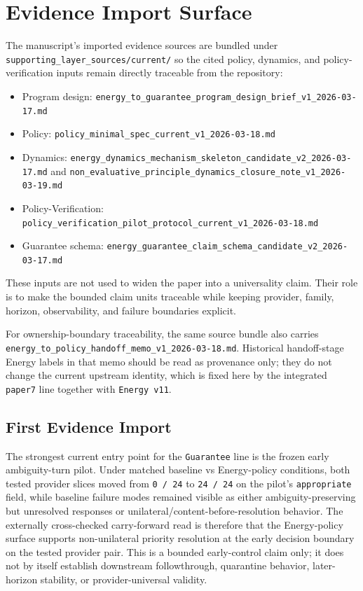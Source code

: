 \documentclass[11pt]{article}
\begin{document}
\section{Evidence Import Surface}

The manuscript's imported evidence sources are bundled under
\texttt{supporting\_layer\_sources/current/} so the cited policy, dynamics,
and policy-verification inputs remain directly traceable from the repository:

\begin{itemize}
\item Program design:
  \texttt{energy\_to\_guarantee\_program\_design\_brief\_v1\_2026-03-17.md}
\item Policy:
  \texttt{policy\_minimal\_spec\_current\_v1\_2026-03-18.md}
\item Dynamics:
  \texttt{energy\_dynamics\_mechanism\_skeleton\_candidate\_v2\_2026-03-17.md}
  and
  \texttt{non\_evaluative\_principle\_dynamics\_closure\_note\_v1\_2026-03-19.md}
\item Policy-Verification:
  \texttt{policy\_verification\_pilot\_protocol\_current\_v1\_2026-03-18.md}
\item Guarantee schema:
  \texttt{energy\_guarantee\_claim\_schema\_candidate\_v2\_2026-03-17.md}
\end{itemize}

These inputs are not used to widen the paper into a universality claim. Their
role is to make the bounded claim units traceable while keeping provider,
family, horizon, observability, and failure boundaries explicit.

For ownership-boundary traceability, the same source bundle also carries
\texttt{energy\_to\_policy\_handoff\_memo\_v1\_2026-03-18.md}. Historical
handoff-stage Energy labels in that memo should be read as provenance only;
they do not change the current upstream identity, which is fixed here by the
integrated \texttt{paper7} line together with \texttt{Energy v11}.

\subsection{First Evidence Import}

The strongest current entry point for the \texttt{Guarantee} line is the frozen
early ambiguity-turn pilot. Under matched baseline vs Energy-policy conditions,
both tested provider slices moved from \texttt{0 / 24} to \texttt{24 / 24} on the
pilot's \texttt{appropriate} field, while baseline failure modes remained visible
as either ambiguity-preserving but unresolved responses or
unilateral/content-before-resolution behavior. The externally cross-checked
carry-forward read is therefore that the Energy-policy surface supports
non-unilateral priority resolution at the early decision boundary on the tested
provider pair. This is a bounded early-control claim only; it does not by itself
establish downstream followthrough, quarantine behavior, later-horizon stability,
or provider-universal validity.
\end{document}
